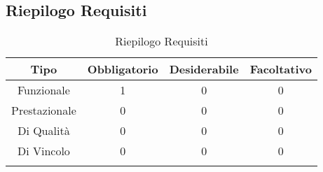 \subsection{Riepilogo Requisiti}
\normalsize
\begin{longtable}{|c|c|c|c|}
\hline 
\textbf{Tipo} & \textbf{Obbligatorio} & \textbf{Desiderabile} & \textbf{Facoltativo}\\
\hline
Funzionale & 1 & 0 & 0\\ \hline
Prestazionale & 0 & 0 & 0\\ \hline
Di Qualità & 0 & 0 & 0\\ \hline
Di Vincolo & 0 & 0 & 0\\ \hline
\caption[Riepilogo Requisiti]{Riepilogo Requisiti}
\label{tabella:riepilogorequi}
\end{longtable}
\clearpage
